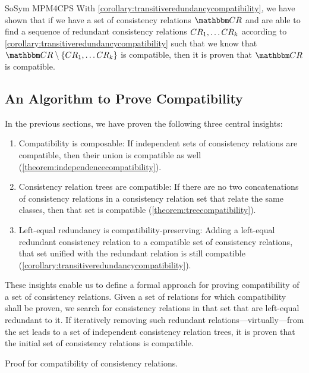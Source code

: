 \begin{copiedFrom}{SoSym MPM4CPS}
With \autoref{corollary:transitiveredundancycompatibility}, we have shown that if we have a set of consistency relations $\consistencyrelationset{CR}$ and are able to find a sequence of redundant consistency relations $CR_{1}, \dots {CR_{k}}$ according to \autoref{corollary:transitiveredundancycompatibility} such that we know that $\consistencyrelationset{CR} \setminus \setted{ \consistencyrelation{CR}{1}, \dots {\consistencyrelation{CR}{k}}}$ is compatible, then it is proven that $\consistencyrelationset{CR}$ is compatible.



\subsection{An Algorithm to Prove Compatibility} %
\label{sec:formalapproach:summary}

In the previous sections, we have proven the following three central insights:
\begin{enumerate}
    \item Compatibility is composable: If independent sets of consistency relations are compatible, then their union is compatible as well (\autoref{theorem:independencecompatibility}).
    \item Consistency relation trees are compatible: If there are no two concatenations of consistency relations in a consistency relation set that relate the same classes, then that set is compatible (\autoref{theorem:treecompatibility}).
    \item Left-equal redundancy is compatibility-preserving: Adding a left-equal redundant consistency relation to a compatible set of consistency relations, that set unified with the redundant relation is still compatible (\autoref{corollary:transitiveredundancycompatibility}).
\end{enumerate}

These insights enable us to define a formal approach for proving compatibility of a set of consistency relations.
Given a set of relations for which compatibility shall be proven, we search for consistency relations in that set that are left-equal redundant to it.
If iteratively removing such redundant relations---virtually---from the set leads to a set of independent consistency relation trees, it is proven that the initial set of consistency relations is compatible.

\begin{algorithm}
    
    \caption[Proof for compatibility of consistency relations]{Proof for compatibility of consistency relations.}
    \label{algo:compatibility}
\end{algorithm}


\end{copiedFrom}
